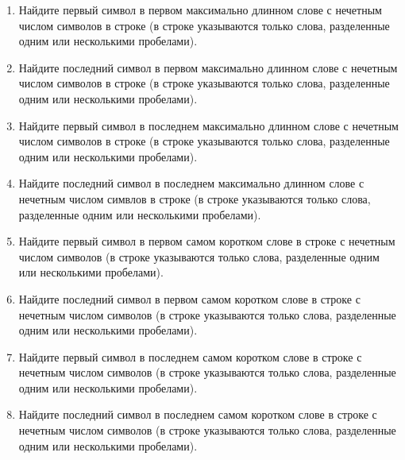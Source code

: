 \begin{enumerate}
\item Найдите первый символ в первом максимально длинном слове с нечетным числом символов в строке (в строке указываются только слова, разделенные одним или несколькими пробелами). 
\item Найдите последний символ в первом максимально длинном слове с нечетным числом символов в строке (в строке указываются только слова, разделенные одним или несколькими пробелами). 
\item Найдите первый символ в последнем максимально длинном слове с нечетным числом символов в строке (в строке указываются только слова, разделенные одним или несколькими пробелами). 
\item Найдите последний символ в последнем максимально длинном слове с нечетным числом симвлов в строке (в строке указываются только слова, разделенные одним или несколькими пробелами). 
\item Найдите первый символ в первом самом коротком слове в строке с нечетным числом символов (в строке указываются только слова, разделенные одним или несколькими пробелами). 
\item Найдите последний символ в первом самом коротком слове в строке с нечетным числом символов (в строке указываются только слова, разделенные одним или несколькими пробелами). 
\item Найдите первый символ в последнем самом коротком слове в строке с нечетным числом символов (в строке указываются только слова, разделенные одним или несколькими пробелами). 
\item Найдите последний символ в последнем самом коротком слове в строке с нечетным числом символов (в строке указываются только слова, разделенные одним или несколькими пробелами). 


\end{enumerate}
